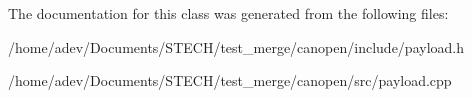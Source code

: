 The documentation for this class was generated from the following files\+:\begin{DoxyCompactItemize}
\item 
/home/adev/\+Documents/\+S\+T\+E\+C\+H/test\+\_\+merge/canopen/include/payload.\+h\item 
/home/adev/\+Documents/\+S\+T\+E\+C\+H/test\+\_\+merge/canopen/src/payload.\+cpp\end{DoxyCompactItemize}
